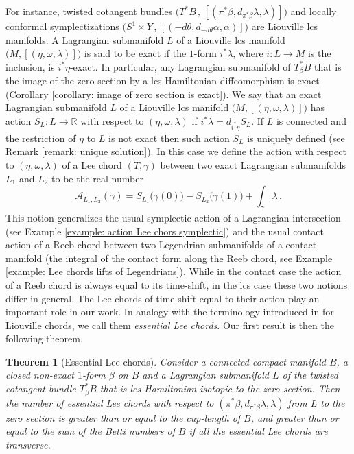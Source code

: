 \documentclass{amsart}
\newtheorem{thm}{Theorem}[section]
\theoremstyle{remark}
\begin{document}
For instance,
twisted cotangent bundles
$\big( T^{\ast}B \,,\,  [(\pi^{\ast}\beta, d_{\pi^{\ast}\beta}\lambda, \lambda)] \big)$
and locally conformal symplectizations
$\big( S^1 \times Y \,,\, [(-d\theta, d_{-d\theta}\alpha, \alpha)] \big)$
are Liouville lcs manifolds. 
A Lagrangian submanifold $L$
of a Liouville lcs manifold $\big( M , [(\eta, \omega, \lambda)] \big)$
is said to be exact if the $1$-form $i^{\ast}\lambda$,
where $i: L \rightarrow M$ is the inclusion,
is $i^{\ast}\eta$-exact.
In particular,
any Lagrangian submanifold of $T_{\beta}^{\ast}B$
that is the image of the zero section
by a lcs Hamiltonian diffeomorphism is exact
(Corollary \ref{corollary: image of zero section is exact}).
We say that an exact Lagrangian submanifold $L$
of a Liouville lcs manifold $\big( M, [(\eta, \omega, \lambda)] \big)$
has action $S_L: L \rightarrow \mathbb{R}$
with respect to $(\eta, \omega, \lambda)$
if $i^{\ast}\lambda = d_{i^{\ast}\eta} S_L$.
If $L$ is connected
and the restriction of $\eta$ to $L$ is not exact
then such action $S_L$ is uniquely defined
(see Remark \ref{remark: unique solution}).
In this case we define the action
with respect to $(\eta, \omega, \lambda)$
of a Lee chord $(T, \gamma)$
between two exact Lagrangian submanifolds $L_1$ and $L_2$
to be the real number
\[
\mathcal{A}_{L_1, L_2} (\gamma)
= S_{L_1} \big(\gamma(0)\big) - S_{L_2} \big(\gamma(1)\big) + \int_{\gamma} \lambda \,.
\]
This notion generalizes the usual symplectic action
of a Lagrangian intersection
(see Example \ref{example: action Lee chors symplectic})
and the usual contact action of a Reeb chord
between two Legendrian submanifolds
of a contact manifold
(the integral of the contact form along the Reeb chord,
see Example \ref{example: Lee chords lifts of Legendrians}).
While in the contact case the action of a Reeb chord
is always equal to its time-shift,
in the lcs case these two notions differ in general.
The Lee chords of time-shift equal to their action
play an important role in our work.
In analogy with the terminology
introduced in \cite{Currier} for Liouville chords,
we call them \emph{essential Lee chords}.
Our first result is then the following theorem.

\begin{thm}[Essential Lee chords]\label{theorem: lcs Arnold conjecture intro}
Consider a connected compact manifold $B$,
a closed non-exact $1$-form $\beta$ on $B$
and a Lagrangian submanifold $L$ 
of the twisted cotangent bundle $T^{\ast}_{\beta}B$
that is lcs Hamiltonian isotopic to the zero section.
Then the number of essential Lee chords
with respect to $(\pi^{\ast}\beta, d_{\pi^{\ast}\beta}\lambda, \lambda)$
from $L$ to the zero section
is greater than or equal to the cup-length of $B$,
and greater than or equal to the sum of the Betti numbers of $B$
if all the essential Lee chords are transverse.
\end{thm}
\end{document}

